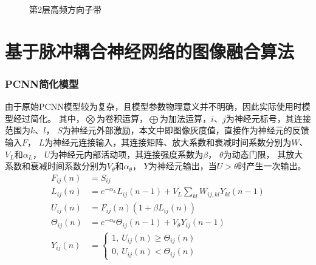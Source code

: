 \documentclass[10pt,aspectratio=43,mathserif]{beamer}
\begin{document}
\begin{frame}
\begin{figure}[ht]
\begin{minipage}[t]{0.7\linewidth}
		\caption{第2层高频方向子带}
	\end{minipage}
\end{figure}
		\end{frame}
\section[PCNN]{基于脉冲耦合神经网络的图像融合算法}

		\begin{frame}
		  \frametitle{\textbf{PCNN简化模型}}
          由于原始PCNN模型较为复杂，且模型参数物理意义并不明确，因此实际使用时模型经过简化。
其中，$\bigotimes$为卷积运算，$\bigoplus$为加法运算，$i$、$j$为神经元标号，其连接范围为$k$、$l$，
$S$为神经元外部激励，本文中即图像灰度值，直接作为神经元的反馈输入$F$，
$L$为神经元连接输入，其连接矩阵、放大系数和衰减时间系数分别为$W$、$V_L$和$\alpha _L$，
$U$为神经元内部活动项，其连接强度系数为$\beta$，
$\theta$为动态门限， 其放大系数和衰减时间系数分别为$V_{\theta}$和$\alpha _{\theta}$，
$Y$为神经元输出，当$U>\theta$时产生一次输出。
            \begin{equation*}
            \begin{aligned}
            F_{ij}(n) &= S_{ij}
            \\
            L_{ij}(n) &= e^{-\alpha _L} L_{ij}(n-1) + V_L \sum_{kl} W_{ij,kl}Y_{kl}(n-1)
            \\
            U_{ij}(n) &= F_{ij}(n) (1+\beta L_{ij}(n))
            \\
            \Theta _{ij}(n) &=e^{-\alpha _\theta} \Theta _{ij}(n-1) + V_\theta Y_{ij}(n-1)
            \\
            Y_{ij}(n) &= \left\{\begin{matrix}1, ~ U_{ij}(n) \geq \Theta _{ij}(n)\\ 0, ~ U_{ij}(n) < \Theta _{ij}(n)\end{matrix}\right.
            \end{aligned}
            \end{equation*}
		\end{frame}
\end{document}
